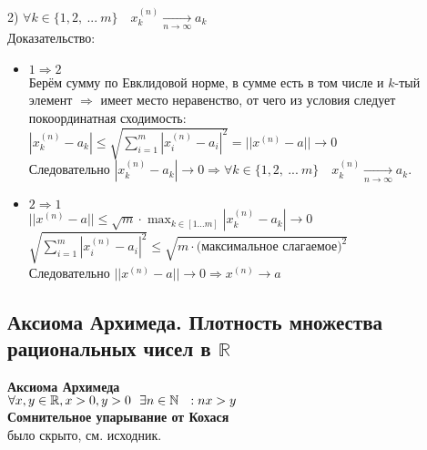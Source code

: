 2) $\forall k \in \{1,2,\ ...\ m\} \quad x^{(n)}_k \xrightarrow[n\to\infty]{} a_k$\\
Доказательство:
\begin{itemize}
\item $1 \Rightarrow 2$\\
Берём сумму по Евклидовой норме, в сумме есть в том числе и $k$-тый элемент $\Rightarrow$ имеет место неравенство, от чего из условия следует покоординатная сходимость: \\
$|x^{(n)}_k - a_k| \leq \sqrt{\sum_{i=1}^m |x^{(n)}_i - a_i|^2} = ||x^{(n)} - a|| \rightarrow 0$\\
Следовательно $|x^{(n)}_k - a_k| \rightarrow 0 \Rightarrow \forall k \in \{1,2,\ ...\ m\} \quad x^{(n)}_k \xrightarrow[n\to\infty]{} a_k$.
\item $2 \Rightarrow 1$\\
$\displaystyle ||x^{(n)}-a|| \leq \sqrt{m} \cdot \max_{k\in[1\dots m]}|x^{(n)}_k - a_k| \rightarrow 0$\\
$\sqrt{\sum_{i=1}^m |x^{(n)}_i - a_i|^2} \leq \sqrt{m \cdot \text{(максимальное слагаемое)}^2}$\\
Следовательно $||x^{(n)}-a|| \rightarrow 0 \Rightarrow x^{(n)} \rightarrow a$
\end{itemize}

\newpage
\subsection{Аксиома Архимеда. Плотность множества рациональных чисел в $\mathbb R$} %
\textbf{Аксиома Архимеда}\\
$\forall x,y\in \operatorname*{\mathbb{R}}, x>0, y>0 \ \ \exists n \in \operatorname*{\mathbb{N}} \ \ : nx>y$\\
\newline
\textbf{Сомнительное упарывание от Кохася}\\
было скрыто, см. исходник.\\
 
